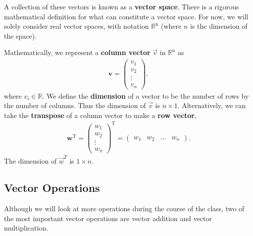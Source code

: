 \documentclass[11pt]{article} %
\begin{document}
A collection of these vectors is known as a \textbf{vector space}. There is a rigorous mathematical definition for what can constitute a vector space. For now, we will solely consider real vector spaces, with notation $\mathbb{R}^\textrm{n}$ (where $n$ is the dimension of the space).

Mathematically, we represent a \textbf{column vector} $\Vec{v}$ in $\mathbb{R}^\textrm{n}$ as
\begin{align}
    \textbf{v} =
    \begin{pmatrix}
        v_1 \\
        v_2 \\
        \vdots \\
        v_n
    \end{pmatrix}, \nonumber
\end{align}
\noindent where $v_i \in \mathbb{R}$. We define the \textbf{dimension} of a vector to be the number of rows by the number of columns. Thus the dimension of $\Vec{v}$ is $n \times 1$. Alternatively, we can take the \textbf{transpose} of a column vector to make a \textbf{row vector},
\begin{align}
    \textbf{w}^\text{T}=
    \begin{pmatrix}
        w_1 \\
        w_2 \\
        \vdots \\
        w_n
    \end{pmatrix}^\text{T}=
    \begin{pmatrix}
        w_1 & w_2 & \hdots & w_n
    \end{pmatrix}. \nonumber
\end{align}
The dimension of $\Vec{w}^T$ is $1\times n$.

\subsection{Vector Operations}
Although we will look at more operations during the course of the class, two of the most important vector operations are vector addition and vector multiplication.
\end{document}
